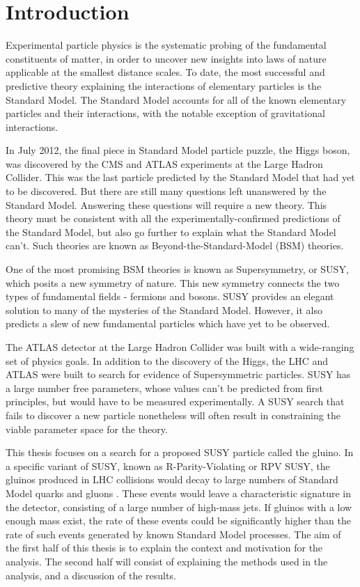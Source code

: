 \chapter{Introduction} \label{ch:intro}

Experimental particle physics is the systematic probing of the fundamental constituents of matter,
in order to uncover new insights into laws of nature applicable at the smallest distance scales.
To date, the most successful and predictive theory explaining the interactions of elementary particles is the Standard Model.
The Standard Model accounts for all of the known elementary particles and their interactions, with the notable exception of gravitational interactions.

In July 2012, the final piece in Standard Model particle puzzle, the Higgs boson, was discovered by the CMS and ATLAS experiments at the
Large Hadron Collider.
This was the last particle predicted by the Standard Model that had yet to be discovered.
But there are still many questions left unanswered by the Standard Model.
Answering these questions will require a new theory.
This theory must be consistent with all the experimentally-confirmed predictions of the Standard Model,
but also go further to explain what the Standard Model can't.
Such theories are known as Beyond-the-Standard-Model (BSM) theories.

One of the most promising BSM theories is known as Supersymmetry, or SUSY, which posits a new symmetry of nature.
This new symmetry connects the two types of fundamental fields - fermions and bosons.
SUSY provides an elegant solution to many of the mysteries of the Standard Model.
However, it also predicts a slew of new fundamental particles which have yet to be observed.

The ATLAS detector at the Large Hadron Collider was built with a wide-ranging set of physics goals.
In addition to the discovery of the Higgs, the LHC and ATLAS were built to search for evidence of Supersymmetric particles.
SUSY has a large number free parameters, whose values can't be predicted from first principles, but would have to be measured experimentally.
A SUSY search that fails to discover a new particle nonetheless will often result in constraining the viable parameter space for the theory.

This thesis focuses on a search for a proposed SUSY particle called the gluino.
In a specific variant of SUSY, known as R-Parity-Violating or RPV SUSY, the gluinos produced in LHC collisions would
decay to large numbers of Standard Model quarks and gluons .
These events would leave a characteristic signature in the detector, consisting of a large number of high-mass jets.
If gluinos with a low enough mass exist, the rate of these events could be significantly higher than the rate of such events
generated by known Standard Model processes.
The aim of the first half of this thesis is to explain the context and motivation for the analysis.
The second half will consist of explaining the methods used in the analysis, and a discussion of the results.

